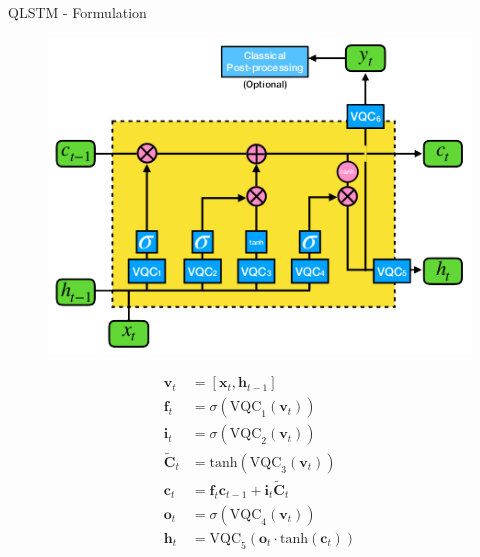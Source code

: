 \begin{frame}{QLSTM - Formulation}
	\begin{minipage}[c]{.55\linewidth}
		\begin{figure}[h]
			\includegraphics[width=\linewidth]{qlstm}
		\end{figure}
	\end{minipage}
	\begin{minipage}[c]{.35\linewidth}
		\begin{align*}
			\textbf{v}_t &= [\textbf{x}_t, \textbf{h}_{t-1}] \\
			\textbf{f}_t &= \sigma (\text{VQC}_1 (\textbf{v}_t )) \\
			\textbf{i}_t &= \sigma (\text{VQC}_2 (\textbf{v}_t )) \\
			\tilde{\textbf{C}}_t &= \text{tanh} (\text{VQC}_3 (\textbf{v}_t)) \\
			\textbf{c}_t &= \textbf{f}_t   \textbf{c}_{t-1} + \textbf{i}_t  \tilde{\textbf{C}}_t \\
			\textbf{o}_t &= \sigma (\text{VQC}_4 (\textbf{v}_t )) \\
			\textbf{h}_t &= \text{VQC}_5 (\textbf{o}_t  \cdot \text{tanh}(\textbf{c}_t ))
		\end{align*}
	\end{minipage}

\end{frame}

